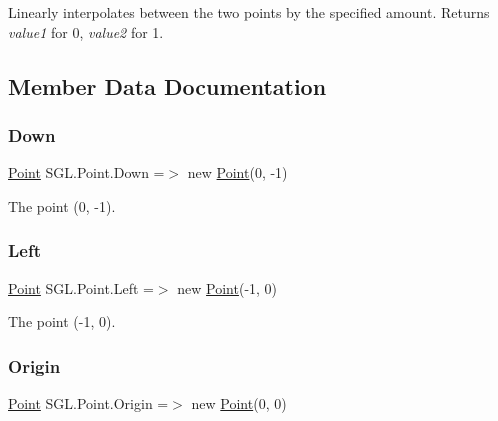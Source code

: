 Linearly interpolates between the two points by the specified amount. Returns {\itshape value1}  for 0, {\itshape value2}  for 1. 



\subsection{Member Data Documentation}
\mbox{\label{struct_s_g_l_1_1_point_a0bc08cef11531d4036aa895d2c33af1e}} 
\subsubsection{\texorpdfstring{Down}{Down}}
{\footnotesize\ttfamily \mbox{\hyperlink{struct_s_g_l_1_1_point}{Point}} S\+G\+L.\+Point.\+Down =$>$ new \mbox{\hyperlink{struct_s_g_l_1_1_point}{Point}}(0, -\/1)\hspace{0.3cm}{\ttfamily [static]}}



The point (0, -\/1). 

\mbox{\label{struct_s_g_l_1_1_point_a26624170987d06859725b637117fa211}} 
\subsubsection{\texorpdfstring{Left}{Left}}
{\footnotesize\ttfamily \mbox{\hyperlink{struct_s_g_l_1_1_point}{Point}} S\+G\+L.\+Point.\+Left =$>$ new \mbox{\hyperlink{struct_s_g_l_1_1_point}{Point}}(-\/1, 0)\hspace{0.3cm}{\ttfamily [static]}}



The point (-\/1, 0). 

\mbox{\label{struct_s_g_l_1_1_point_a4dd7959c1b84f270da8c3b51c2bc0a11}} 
\subsubsection{\texorpdfstring{Origin}{Origin}}
{\footnotesize\ttfamily \mbox{\hyperlink{struct_s_g_l_1_1_point}{Point}} S\+G\+L.\+Point.\+Origin =$>$ new \mbox{\hyperlink{struct_s_g_l_1_1_point}{Point}}(0, 0)\hspace{0.3cm}{\ttfamily [static]}}



